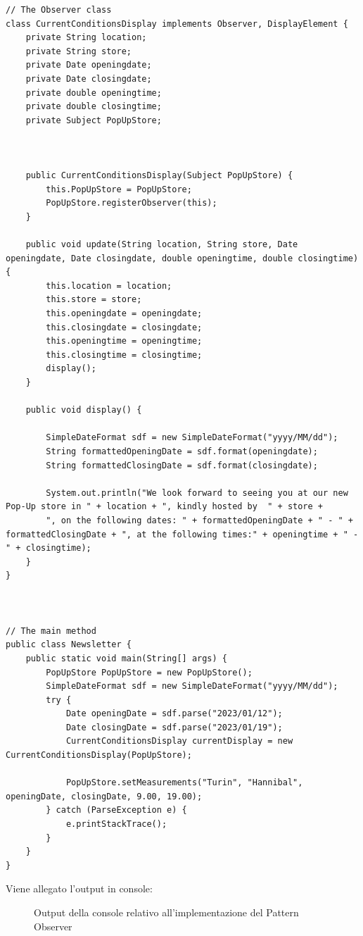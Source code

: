 \documentclass[12pt]{article}
\begin{document}
\begin{lstlisting}
// The Observer class
class CurrentConditionsDisplay implements Observer, DisplayElement {
    private String location;
    private String store;   
    private Date openingdate;
    private Date closingdate;
    private double openingtime;
    private double closingtime;
    private Subject PopUpStore;

    
    
    public CurrentConditionsDisplay(Subject PopUpStore) { 
        this.PopUpStore = PopUpStore; 
        PopUpStore.registerObserver(this);
    }
    
    public void update(String location, String store, Date openingdate, Date closingdate, double openingtime, double closingtime) { 
        this.location = location;
        this.store = store;
        this.openingdate = openingdate;
        this.closingdate = closingdate;
        this.openingtime = openingtime;
        this.closingtime = closingtime;
        display();
    }

    public void display() {

        SimpleDateFormat sdf = new SimpleDateFormat("yyyy/MM/dd");
        String formattedOpeningDate = sdf.format(openingdate);
        String formattedClosingDate = sdf.format(closingdate);

        System.out.println("We look forward to seeing you at our new Pop-Up store in " + location + ", kindly hosted by  " + store + 
        ", on the following dates: " + formattedOpeningDate + " - " + formattedClosingDate + ", at the following times:" + openingtime + " - " + closingtime);
    } 
}



// The main method
public class Newsletter {
    public static void main(String[] args) {
        PopUpStore PopUpStore = new PopUpStore();
        SimpleDateFormat sdf = new SimpleDateFormat("yyyy/MM/dd");
        try {
            Date openingDate = sdf.parse("2023/01/12");
            Date closingDate = sdf.parse("2023/01/19");
            CurrentConditionsDisplay currentDisplay = new CurrentConditionsDisplay(PopUpStore);

            PopUpStore.setMeasurements("Turin", "Hannibal", openingDate, closingDate, 9.00, 19.00); 
        } catch (ParseException e) {
            e.printStackTrace();
        }
    }
}

\end{lstlisting}

Viene allegato l'output in console: 

\begin{figure}[!h]
  \caption{\small Output della console relativo all'implementazione del Pattern Observer}
  \label{fig:pattern_observer_compiled}
\end{figure}
\end{document}
